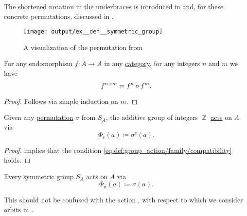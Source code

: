 \begin{example}
\begin{thmenum}
    The shortened notation in the underbraces is introduced in  and, for these concrete permutations, discussed in .

    \begin{figure}
      \centering
      \texttt{[image: output/ex\_\_def\_\_symmetric\_group]}
      \caption{A visualization of the permutation from }
      \label{fig:ex:def:symmetric_group/diamond}
    \end{figure}
  \end{thmenum}
\end{example}

\begin{lemma}\label{thm:sum_of_powers_in_composition}
  For any endomorphism \( f: A \to A \) in any \hyperref[def:category]{category}, for any integers \( n \) and \( m \) we have
  \begin{equation*}
    f^{n + m} = f^n \bincirc f^m.
  \end{equation*}
\end{lemma}
\begin{proof}
  Follows via simple induction on \( m \).
\end{proof}

\begin{proposition}\label{thm:symmetric_group_action}
  Given any \hyperref[def:symmetric_group]{permutation} \( \sigma \) from \( S_A \), the additive group of integers \( \BbbZ \) \hyperref[def:group_action]{acts} on \( A \) via
  \begin{equation*}
    \Phi_e(a) \coloneqq \sigma^e(a).
  \end{equation*}
\end{proposition}
\begin{proof}
   implies that the condition \eqref{eq:def:group_action/family/compatibility} holds.
\end{proof}

\begin{remark}\label{rem:symmetric_group_actions}
  Every symmetric group \( S_A \) acts on \( A \) via
  \begin{equation*}
    \Phi_\sigma(a) \coloneqq \sigma(a).
  \end{equation*}

  This should not be confused with the action , with respect to which we consider orbits in .
\end{remark}


